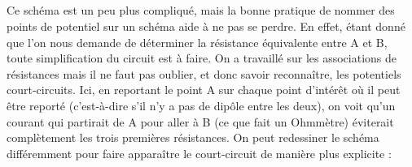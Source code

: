 \documentclass[../main/main.tex]{subfiles}
\begin{document}
\subsection{}
Ce schéma est un peu plus compliqué, mais la bonne pratique de nommer des points
de potentiel sur un schéma aide à ne pas se perdre. En effet, étant donné que
l'on nous demande de déterminer la résistance équivalente entre A et B, toute
simplification du circuit est à faire. On a travaillé sur les associations de
résistances mais il ne faut pas oublier, et donc savoir reconnaître, les
potentiels court-circuits. Ici, en reportant le point A sur chaque point
d'intérêt où il peut être reporté (c'est-à-dire s'il n'y a pas de dipôle entre
les deux), on voit qu'un courant qui partirait de A pour aller à B (ce que fait
un Ohmmètre) éviterait complètement les trois premières résistances. On peut
redessiner le schéma différemment pour faire apparaître le court-circuit de
manière plus explicite :
\end{document}
